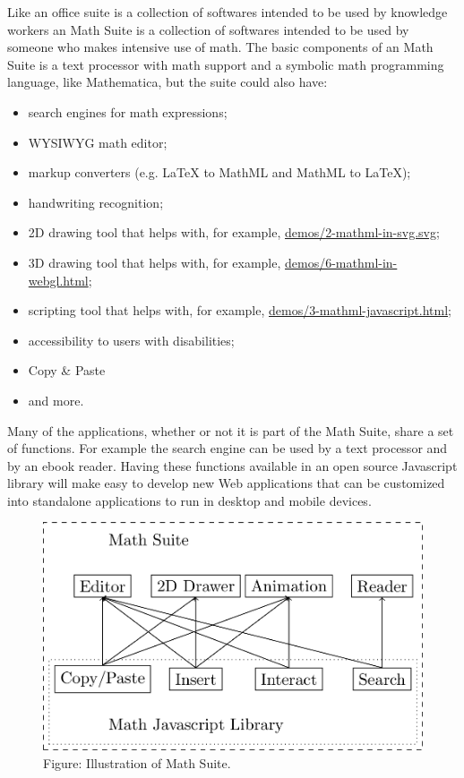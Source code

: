 Like an office suite is a collection of softwares intended to be used by
knowledge workers an Math Suite is a collection of softwares intended to be used
by someone who makes intensive use of math. The basic components of an Math
Suite is a text processor with math support and a symbolic math programming
language, like Mathematica, but the suite could also have:
\begin{itemize}
  \item search engines for math expressions;
  \item WYSIWYG math editor;
  \item markup converters (e.g. LaTeX to MathML and MathML to LaTeX);
  \item handwriting recognition;
  \item 2D drawing tool that helps with, for example,
    \href{http://fred-wang.github.io/MathUI2014/demos/2-mathml-in-svg.svg}{demos/2-mathml-in-svg.svg};
  \item 3D drawing tool that helps with, for example,
    \href{http://fred-wang.github.io/MathUI2014/demos/6-mathml-in-webgl.html}{demos/6-mathml-in-webgl.html};
  \item scripting tool that helps with, for example,
    \href{http://fred-wang.github.io/MathUI2014/demos/3-mathml-javascript.html}{demos/3-mathml-javascript.html};
  \item accessibility to users with disabilities;
  \item Copy \& Paste
  \item and more.
\end{itemize}

Many of the applications, whether or not it is part of the Math Suite,
share a set of functions. For
example the search engine can be used by a text processor and by an ebook
reader. Having
these functions available in an open source Javascript library will make easy to
develop new Web applications that can be customized into standalone applications
to run in desktop and mobile devices.

\begin{figure}[!htb]
  \centering
  \includegraphics[width=.5\textwidth]{math-suite-diagram.png} \\
  Figure: Illustration of Math Suite.
\end{figure}

